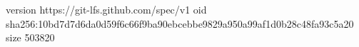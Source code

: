 version https://git-lfs.github.com/spec/v1
oid sha256:10bd7d7d6da0d59f6c66f9ba90ebcebbe9829a950a99af1d0b28c48fa93c5a20
size 503820
